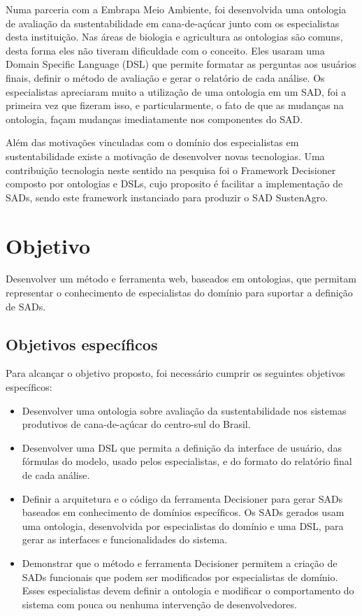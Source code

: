 Numa parceria com a Embrapa Meio Ambiente, foi desenvolvida uma ontologia
de avaliação da sustentabilidade em cana-de-açúcar junto com os especialistas
desta instituição. Nas áreas de biologia e agricultura as ontologias
são comuns, desta forma eles não tiveram dificuldade com o conceito.
Eles usaram uma \foreignlanguage{english}{Domain Specific Language}
(DSL) \citep{fowler2010domain} que permite formatar as perguntas
aos usuários finais, definir o método de avaliação e gerar o relatório
de cada análise. Os especialistas apreciaram muito a utilização de
uma ontologia em um SAD, foi a primeira vez que fizeram isso, e particularmente,
o fato de que as mudanças na ontologia, façam mudanças imediatamente
nos componentes do SAD.

Além das motivações vinculadas com o domínio dos especialistas em
sustentabilidade existe a motivação de desenvolver novas tecnologias.
Uma contribuição tecnologia neste sentido na pesquisa foi o Framework
Decisioner composto por ontologias e \foreignlanguage{english}{DSLs},
cujo proposito é facilitar a implementação de SADs, sendo este framework
instanciado para produzir o SAD SustenAgro.

\section{Objetivo}

Desenvolver um método e ferramenta web, baseados em ontologias, que
permitam representar o conhecimento de especialistas do domínio para
suportar a definição de SADs. 

\subsection*{Objetivos específicos}

Para alcançar o objetivo proposto, foi necessário cumprir os seguintes
objetivos específicos: 
\begin{itemize}
\item Desenvolver uma ontologia sobre avaliação da sustentabilidade nos
sistemas produtivos de cana-de-açúcar do centro-sul do Brasil.
\item Desenvolver uma DSL que permita a definição da interface de usuário,
das fórmulas do modelo, usado pelos especialistas, e do formato do
relatório final de cada análise.
\item Definir a arquitetura e o código da ferramenta Decisioner para gerar
SADs baseados em conhecimento de domínios específicos. Os SADs gerados
usam uma ontologia, desenvolvida por especialistas do domínio e uma
DSL, para gerar as interfaces e funcionalidades do sistema.
\item Demonstrar que o método e ferramenta Decisioner permitem a criação
de SADs funcionais que podem ser modificados por especialistas de
domínio. Esses especialistas devem definir a ontologia e modificar
o comportamento do sistema com pouca ou nenhuma intervenção de desenvolvedores.
\end{itemize}

